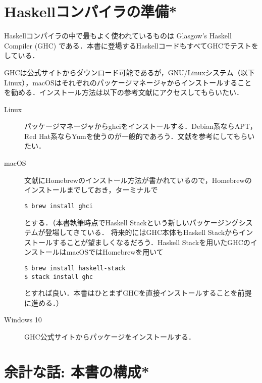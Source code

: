 \documentclass[a4paper,draft]{jsbook}
\newcommand{\programminglanguage}[1]{\textsf{#1}}
\newcommand{\haskell}{\programminglanguage{Haskell}}
\newcommand{\keyword}[1]{{\underline{\emph{#1}}}}
\begin{document}



\section{\haskell コンパイラの準備*}

\haskell コンパイラの中で最もよく使われているものは Glasgow's Haskell Compiler (GHC) である．本書に登場する\haskell コードもすべてGHCでテストをしている．

GHCは公式サイト\cite{haskellplatform}からダウンロード可能であるが，GNU/Linuxシステム（以下Linux），macOSはそれぞれのパッケージマネージャからインストールすることを勧める．インストール方法は以下の参考文献にアクセスしてもらいたい．
\begin{description}
\item[Linux] パッケージマネージャからghciをインストールする．Debian系ならAPT，Red Hat系ならYumを使うのが一般的であろう．文献\cite{linux}を参考にしてもらいたい．
\item[macOS] 文献\cite{osx}にHomebrewのインストール方法が書かれているので，Homebrewのインストールまでしておき，ターミナルで
\begin{verbatim}
$ brew install ghci
\end{verbatim} %
とする．（本書執筆時点でHaskell Stackという新しいパッケージングシステムが登場してきている．
将来的にはGHC本体もHaskell Stackからインストールすることが望ましくなるだろう．Haskell Stackを用いたGHCのインストールはmacOSではHomebrewを用いて
\begin{verbatim}
$ brew install haskell-stack
$ stack install ghc
\end{verbatim} %
とすれば良い．本書はひとまずGHCを直接インストールすることを前提に進める．）
\item[Windows 10] GHC公式サイト\cite{haskellplatform}からパッケージをインストールする．
\end{description}

\section{余計な話: 本書の構成*}
\end{document}
